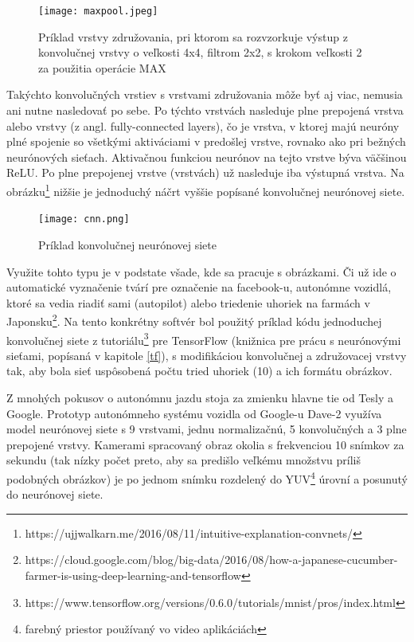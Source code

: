 	\begin{figure}[H]
		\begin{center}\texttt{[image: maxpool.jpeg]}\end{center}
		\caption[Vrstva združovania - príklad vzorkovania]{Príklad vrstvy združovania, pri ktorom sa rozvzorkuje výstup z konvolučnej vrstvy o veľkosti 4x4, filtrom 2x2, s krokom veľkosti 2 za použitia operácie MAX}\label{fig:cnn}
	\end{figure}
	Takýchto konvolučných vrstiev s vrstvami združovania môže byť aj viac, nemusia ani nutne nasledovať po sebe. Po týchto vrstvách nasleduje plne prepojená vrstva alebo vrstvy (z angl. fully-connected layers), čo je vrstva, v ktorej majú neuróny plné spojenie so všetkými aktiváciami v predošlej vrstve, rovnako ako pri bežných neurónových sieťach. Aktivačnou funkciou neurónov na tejto vrstve býva väčšinou ReLU. Po plne prepojenej vrstve (vrstvách) už nasleduje iba výstupná vrstva. Na obrázku\footnote{https://ujjwalkarn.me/2016/08/11/intuitive-explanation-convnets/} nižšie je jednoduchý náčrt vyššie popísané konvolučnej neurónovej siete. 
	\begin{figure}[H]
		\begin{center}\texttt{[image: cnn.png]}\end{center}
		\caption[Konvolučná neurónová sieť]{Príklad konvolučnej neurónovej siete}\label{conv_nn}
	\end{figure}
	
	Využite tohto typu je v podstate všade, kde sa pracuje s obrázkami. Či už ide o automatické vyznačenie tvárí pre označenie na facebook-u, autonómne vozidlá, ktoré sa vedia riadiť sami (autopilot) alebo triedenie uhoriek na farmách v Japonsku\footnote{https://cloud.google.com/blog/big-data/2016/08/how-a-japanese-cucumber-farmer-is-using-deep-learning-and-tensorflow}. Na tento konkrétny softvér bol použitý príklad kódu jednoduchej konvolučnej siete z tutoriálu\footnote{https://www.tensorflow.org/versions/0.6.0/tutorials/mnist/pros/index.html} pre TensorFlow (knižnica pre prácu s neurónovými sieťami, popísaná v kapitole \ref{tf}), s modifikáciou konvolučnej a združovacej vrstvy tak, aby bola sieť uspôsobená počtu tried uhoriek (10) a ich formátu obrázkov. 
	
	Z mnohých pokusov o autonómnu jazdu stoja za zmienku hlavne tie od Tesly a Google. Prototyp autonómneho systému vozidla od Google-u Dave-2\cite{google_car} využíva model neurónovej siete s 9 vrstvami, jednu normalizačnú, 5 konvolučných a 3 plne prepojené vrstvy. Kamerami spracovaný obraz okolia s frekvenciou 10 snímkov za sekundu (tak nízky počet preto, aby sa predišlo veľkému množstvu príliš podobných obrázkov) je po jednom snímku rozdelený do YUV\footnote{farebný priestor používaný vo video aplikáciách} úrovní a posunutý do neurónovej siete.   
 
